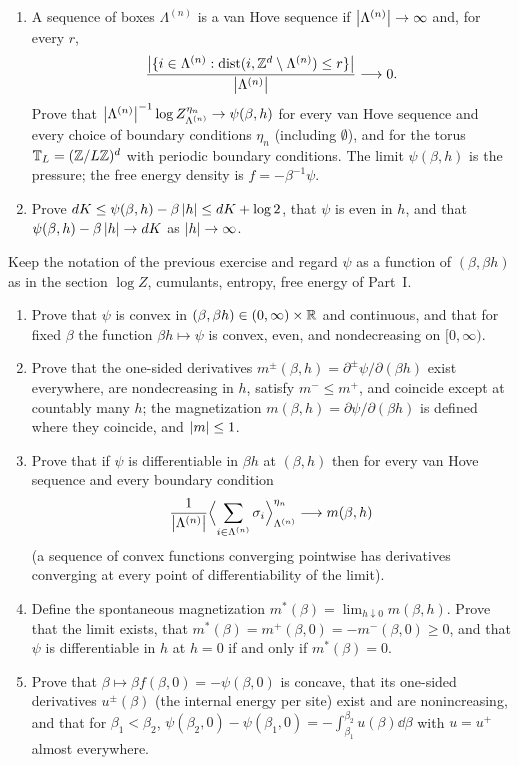\begin{exercise}
\begin{enumerate}[label=(\alph*)]
\item A sequence of boxes $\Lambda^{(n)}$ is a van Hove sequence if
$\left\lvert \Lambda^{(n)}\right\rvert\to\infty$ and, for every $r$,
\[
 \frac{\left\lvert \{i\in\Lambda^{(n)}:\operatorname{dist}(i,\mathbb Z^d\setminus\Lambda^{(n)})\le r\}\right\rvert}{\left\lvert \Lambda^{(n)}\right\rvert}\longrightarrow0 .
\]  Prove that $\left\lvert \Lambda^{(n)}\right\rvert^{-1}\log Z^{\eta_n}_{\Lambda^{(n)}}\to\psi(\beta,h)$
for every van Hove sequence and every choice of boundary conditions $\eta_n$
(including $\emptyset$), and for the torus $\mathbb T_L=(\mathbb Z/L\mathbb Z)^d$ with periodic
boundary conditions.  The limit $\psi(\beta,h)$ is the pressure; the free
energy density is $f=-\beta^{-1}\psi$.
\item Prove $dK\le\psi(\beta,h)-\beta\left\lvert h\right\rvert\le dK+\log2$, that $\psi$ is even in
$h$, and that $\psi(\beta,h)-\beta\left\lvert h\right\rvert\to dK$ as $\left\lvert h\right\rvert\to\infty$.
\end{enumerate}
\end{exercise}

\begin{exercise}
Keep the notation of the previous exercise and regard $\psi$ as a function of
$(\beta,\beta h)$ as in the section $\log Z$, cumulants, entropy, free energy
of Part~I.
\begin{enumerate}[label=(\alph*)]
\item Prove that $\psi$ is convex in $(\beta,\beta h)\in(0,\infty)\times\mathbb R$
and continuous, and that for fixed $\beta$ the function $\beta h\mapsto\psi$ is
convex, even, and nondecreasing on $[0,\infty)$.
\item Prove that the one-sided derivatives
$m^\pm(\beta,h)=\partial^\pm\psi/\partial(\beta h)$ exist everywhere, are
nondecreasing in $h$, satisfy $m^-\le m^+$, and coincide except at countably
many $h$; the magnetization $m(\beta,h)=\partial\psi/\partial(\beta h)$ is
defined where they coincide, and $\left\lvert m\right\rvert\le1$.
\item Prove that if $\psi$ is differentiable in $\beta h$ at $(\beta,h)$ then
for every van Hove sequence and every boundary condition
\[
 \frac1{\left\lvert \Lambda^{(n)}\right\rvert}\Bigl\langle\sum_{i\in\Lambda^{(n)}}\sigma_i\Bigr\rangle^{\eta_n}_{\Lambda^{(n)}}
 \longrightarrow m(\beta,h)
\]
(a sequence of convex functions converging pointwise has derivatives
converging at every point of differentiability of the limit).
\item Define the spontaneous magnetization
$m^*(\beta)=\lim_{h\downarrow0}m(\beta,h)$.  Prove that the limit exists, that
$m^*(\beta)=m^+(\beta,0)=-m^-(\beta,0)\ge0$, and that $\psi$ is differentiable
in $h$ at $h=0$ if and only if $m^*(\beta)=0$.
\item Prove that $\beta\mapsto\beta f(\beta,0)=-\psi(\beta,0)$ is concave,
that its one-sided derivatives $u^\pm(\beta)$ (the internal energy per site)
exist and are nonincreasing, and that for $\beta_1<\beta_2$,
$\psi(\beta_2,0)-\psi(\beta_1,0)=-\int_{\beta_1}^{\beta_2}u(\beta)\dd\beta$
with $u=u^+$ almost everywhere.
\end{enumerate}
\end{exercise}

